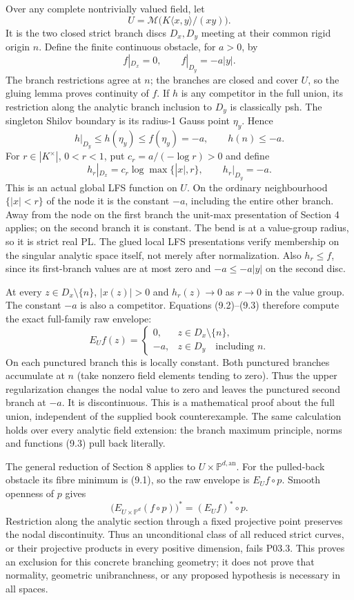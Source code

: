\documentclass[11pt]{article}
\begin{document}
Over any complete nontrivially valued field, let
\[
U=\mathcal M\bigl(K\langle x,y\rangle/(xy)\bigr).
\]
It is the two closed strict branch discs \(D_x,D_y\) meeting at their common rigid origin \(n\). Define the finite continuous obstacle, for \(a>0\), by
\[
f|_{D_x}=0,\qquad f|_{D_y}=-a|y|.
\tag{9.1}
\]
The branch restrictions agree at \(n\); the branches are closed and cover \(U\), so the gluing lemma proves continuity of \(f\). If \(h\) is any competitor in the full union, its restriction along the analytic branch inclusion to \(D_y\) is classically psh. The singleton Shilov boundary is its radius-1 Gauss point \(\eta_y\). Hence
\[
h|_{D_y}\leq h(\eta_y)\leq f(\eta_y)=-a,
\qquad h(n)\leq-a.
\tag{9.2}
\]
For \(r\in|K^\times|\), \(0<r<1\), put \(c_r=a/(-\log r)>0\) and define
\[
h_r|_{D_x}=c_r\log\max\{|x|,r\},\qquad h_r|_{D_y}=-a.
\tag{9.3}
\]
This is an actual global LFS function on \(U\). On the ordinary neighbourhood \(\{|x|<r\}\) of the node it is the constant \(-a\), including the entire other branch. Away from the node on the first branch the unit-max presentation of Section 4 applies; on the second branch it is constant. The bend is at a value-group radius, so it is strict real PL. The glued local LFS presentations verify membership on the singular analytic space itself, not merely after normalization. Also \(h_r\leq f\), since its first-branch values are at most zero and \(-a\leq-a|y|\) on the second disc.

At every \(z\in D_x\setminus\{n\}\), \(|x(z)|>0\) and \(h_r(z)\to0\) as \(r\to0\) in the value group. The constant \(-a\) is also a competitor. Equations (9.2)--(9.3) therefore compute the exact full-family raw envelope:
\[
E_Uf(z)=
\begin{cases}
0,&z\in D_x\setminus\{n\},\\
-a,&z\in D_y\quad\text{including }n.
\end{cases}
\tag{9.4}
\]
On each punctured branch this is locally constant. Both punctured branches accumulate at \(n\) (take nonzero field elements tending to zero). Thus the upper regularization changes the nodal value to zero and leaves the punctured second branch at \(-a\). It is discontinuous. This is a mathematical proof about the full union, independent of the supplied book counterexample. The same calculation holds over every analytic field extension: the branch maximum principle, norms and functions (9.3) pull back literally.

The general reduction of Section 8 applies to \(U\times\mathbb P^{d,\mathrm{an}}\). For the pulled-back obstacle its fibre minimum is (9.1), so the raw envelope is \(E_Uf\circ p\). Smooth openness of \(p\) gives
\[
\bigl(E_{U\times\mathbb P^d}(f\circ p)\bigr)^*=(E_Uf)^*\circ p.
\]
Restriction along the analytic section through a fixed projective point preserves the nodal discontinuity. Thus an unconditional class of all reduced strict curves, or their projective products in every positive dimension, fails P03.3. This proves an exclusion for this concrete branching geometry; it does not prove that normality, geometric unibranchness, or any proposed hypothesis is necessary in all spaces.
\end{document}
